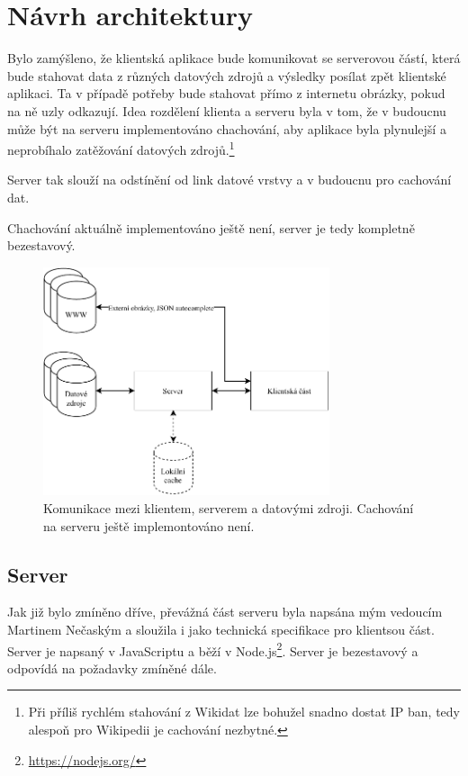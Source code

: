\chapter{Návrh architektury}

Bylo zamýšleno, že klientská aplikace bude komunikovat se serverovou částí, která bude stahovat data z různých datových zdrojů a výsledky posílat zpět klientské aplikaci. Ta v případě potřeby bude stahovat přímo z internetu obrázky, pokud na ně uzly odkazují. Idea rozdělení klienta a serveru byla v tom, že v budoucnu může být na serveru implementováno chachování, aby aplikace byla plynulejší a neprobíhalo zatěžování datových zdrojů.\footnote{Při příliš rychlém stahování z Wikidat lze bohužel snadno dostat IP ban, tedy alespoň pro Wikipedii je cachování nezbytné.}

Server tak slouží na odstínění od link datové vrstvy a v budoucnu pro cachování dat.

Chachování aktuálně implementováno ještě není, server je tedy kompletně bezestavový.

\begin{figure}[h]
    \centering
    \includegraphics[width=0.75\textwidth]{media/communication.pdf}
    \caption{Komunikace mezi klientem, serverem a datovými zdroji. Cachování na serveru ještě implemontováno není.}
\end{figure}



\section{Server}
Jak již bylo zmíněno dříve, převážná část serveru byla napsána mým vedoucím Martinem Nečaským a sloužila i jako technická specifikace pro klientsou část. Server je napsaný v JavaScriptu a běží v Node.js\footnote{\url{https://nodejs.org/}}. Server je bezestavový a odpovídá na požadavky zmíněné dále.

